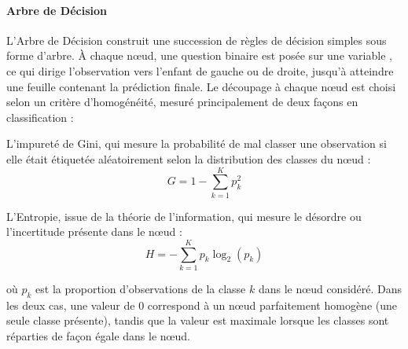 \documentclass[a4paper,12pt, oneside]{article}
\begin{document}
\paragraph{Arbre de Décision\\}
L'Arbre de Décision construit une succession de règles de décision simples sous forme d'arbre. À chaque nœud, une question binaire est posée sur une variable , ce qui dirige l'observation vers l'enfant de gauche ou de droite, jusqu'à atteindre une feuille contenant la prédiction finale. Le découpage à chaque nœud est choisi selon un critère d'homogénéité, mesuré principalement de deux façons en classification :

L'impureté de Gini, qui mesure la probabilité de mal classer une observation si elle était étiquetée aléatoirement selon la distribution des classes du nœud :
\[
G = 1 - \sum_{k=1}^{K} p_k^2
\]

L'Entropie, issue de la théorie de l'information, qui mesure le désordre ou l'incertitude présente dans le nœud :
\[
H = - \sum_{k=1}^{K} p_k \log_2(p_k)
\]

où $p_k$ est la proportion d'observations de la classe $k$ dans le nœud considéré. Dans les deux cas, une valeur de 0 correspond à un nœud parfaitement homogène (une seule classe présente), tandis que la valeur est maximale lorsque les classes sont réparties de façon égale dans le nœud.
\end{document}
